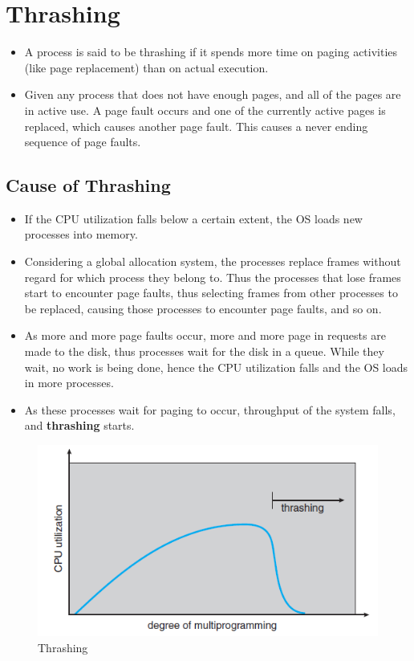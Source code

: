 \documentclass{article}
\theoremstyle{plain}
\theoremstyle{definition}
\begin{document}
\section{Thrashing}
\begin{itemize}
    \item A process is said to be thrashing if it spends more time on paging activities (like page replacement) than on actual execution. 
    
    \item Given any process that does not have enough pages, and all of the pages are in active use. A page fault occurs and one of the currently active pages is replaced, which causes another page fault. This causes a never ending sequence of page faults.
\end{itemize}

\subsection{Cause of Thrashing}
\begin{itemize}
    \item If the CPU utilization falls below a certain extent, the OS loads new processes into memory. 
    
    \item Considering a global allocation system, the processes replace frames without regard for which process they belong to. Thus the processes that lose frames start to encounter page faults, thus selecting frames from other processes to be replaced, causing those processes to encounter page faults, and so on. 
    
    \item As more and more page faults occur, more and more page in requests are made to the disk, thus processes wait for the disk in a queue. While they wait, no work is being done, hence the CPU utilization falls and the OS loads in more processes.
    
    \item As these processes wait for paging to occur, throughput of the system falls, and \textbf{thrashing} starts. 
\end{itemize}
\begin{figure}[!h]
    \centering
    \includegraphics{os14.png}
    \caption{Thrashing}
    \label{fig:my_label_14}
\end{figure}
\end{document}
